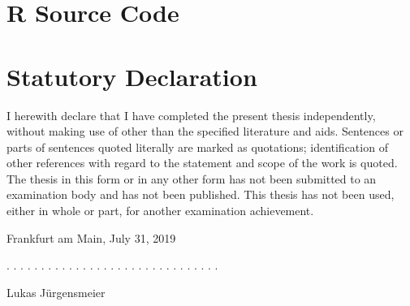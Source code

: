 \documentclass[12pt,a4paper]{article}
\begin{document}
\section{R Source Code}





\clearpage


\newpage
\thispagestyle{empty}
\section*{Statutory Declaration}\label{statutory-declaration}

I herewith declare that I have completed the present thesis independently, without making use of
other than the specified literature and aids. Sentences or parts of sentences quoted literally are
marked as quotations; identification of other references with regard to the statement and scope of
the work is quoted. The thesis in this form or in any other form has not been submitted to an examination body and has not been published.
This thesis has not been used, either in whole or part, for another examination achievement.

\vspace{1cm}

Frankfurt am Main, July 31, 2019
\vspace{2cm}

. . . . . . . . . . . . . . . . . . . . . . . . . . . . . . .
\vspace{0.1cm}

Lukas J\"urgensmeier
\end{document}
